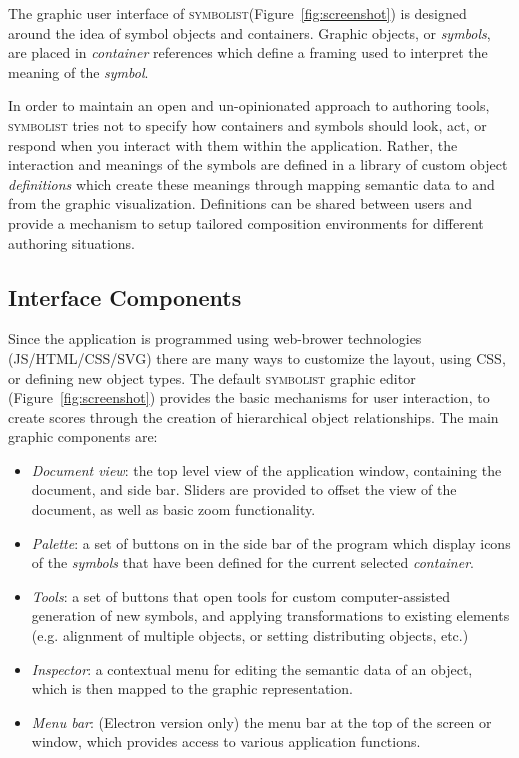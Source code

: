 \documentclass{article}
\def\symbolist{\textsc{symbolist}\xspace}
\begin{document}

The graphic user interface of \symbolist (Figure~\ref{fig:screenshot}) is designed around the idea of symbol objects and containers. Graphic objects, or \textit{symbols}, are placed in \textit{container} references which define a framing used to interpret the meaning of the \textit{symbol}.

In order to maintain an open and un-opinionated approach to authoring tools, \symbolist tries not to specify how containers and symbols should look, act, or respond when you interact with them within the application. 
Rather, the interaction and meanings of the symbols are defined in a library of custom object \textit{definitions} which create these meanings through mapping semantic data to and from the graphic visualization. 
Definitions can be shared between users and provide a mechanism to setup tailored composition environments for different authoring situations.


\subsection{Interface Components}\label{sec:interface_components}


Since the application is programmed using web-brower technologies (JS/HTML/CSS/SVG) there are many ways to customize the layout, using CSS, or defining new object types. 
The default \symbolist graphic editor (Figure~\ref{fig:screenshot}) provides the basic mechanisms for user interaction, to create scores through the creation of hierarchical object relationships.
The main graphic components are:

\begin{itemize}\itemsep0pt 
\item 
\textit{Document view}: the top level view of the application window, containing the document, and side bar. Sliders are provided to offset the view of the document, as well as basic zoom functionality.
\item 
\textit{Palette}: a set of buttons on in the side bar of the program which display icons of the \textit{symbols} that have been defined for the current selected \textit{container}. 
\item 
\textit{Tools}: a set of buttons that open tools for custom computer-assisted generation of new symbols, and applying transformations to existing elements (e.g. alignment of multiple objects, or setting distributing objects, etc.)
\item 
\textit{Inspector}: a contextual menu for editing the semantic data of an object, which is then mapped to the graphic representation.
\item 
\textit{Menu bar}: (Electron version only) the menu bar at the top of the screen or window, which provides access to various application functions.
\end{itemize}
\end{document}
